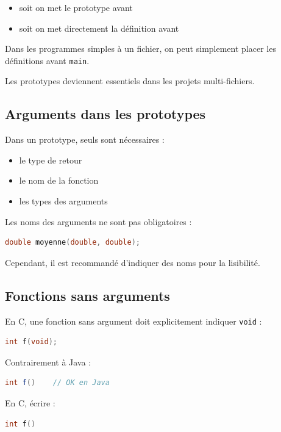 \begin{itemize}
    \item soit on met le prototype avant
    \item soit on met directement la définition avant
\end{itemize}

Dans les programmes simples à un fichier, on peut simplement placer les
définitions avant \texttt{main}.

Les prototypes deviennent essentiels dans les projets multi-fichiers.

\subsection{Arguments dans les prototypes}

Dans un prototype, seuls sont nécessaires :

\begin{itemize}
    \item le type de retour
    \item le nom de la fonction
    \item les types des arguments
\end{itemize}

Les noms des arguments ne sont pas obligatoires :

\begin{lstlisting}[language=C]
double moyenne(double, double);
\end{lstlisting}

Cependant, il est recommandé d’indiquer des noms pour la lisibilité.

\subsection{Fonctions sans arguments}

En C, une fonction sans argument doit explicitement indiquer \texttt{void} :

\begin{lstlisting}[language=C]
int f(void);
\end{lstlisting}

Contrairement à Java :

\begin{lstlisting}[language=Java]
int f()    // OK en Java
\end{lstlisting}

En C, écrire :

\begin{lstlisting}[language=C]
int f()
\end{lstlisting}

